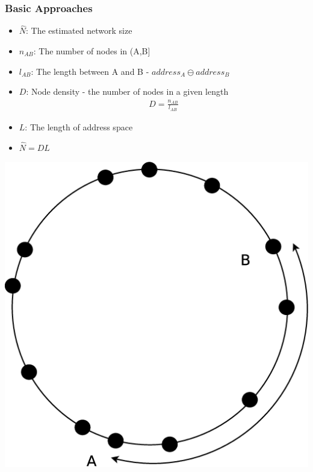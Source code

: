 \documentclass[red]{beamer}
\begin{document}
\begin{frame}
\frametitle{Basic Approaches}
\begin{minipage}{7cm}
\begin{itemize}
\item $\hat{N}$: The estimated network size 
\item $n_{AB}$: The number of nodes in (A,B]
\item $l_{AB}$: The length between A and B - $address_A \ominus address_B$
\item $D$: Node density - the number of nodes in a given length
\begin{eqnarray*}
D = \frac{n_{AB}}{l_{AB}}
\end{eqnarray*}
\item $L$: The length of address space 
\item $\hat{N} = DL$
\end{itemize}
\end{minipage}
\begin{minipage}{3cm}
\includegraphics[scale=0.15]{figs/density}
\end{minipage}
\end{frame}
\end{document}

